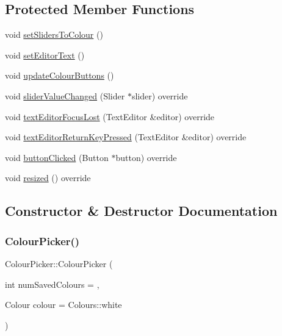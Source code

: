 \subsection*{Protected Member Functions}
\begin{DoxyCompactItemize}
\item 
void \mbox{\hyperlink{classColourPicker_ab5ff0a207d39bf95dbfa7f99b1ceb195}{set\+Sliders\+To\+Colour}} ()
\item 
void \mbox{\hyperlink{classColourPicker_a52bf8209281242f85ec63faa3393e624}{set\+Editor\+Text}} ()
\item 
void \mbox{\hyperlink{classColourPicker_a74764d4f6457f505f3ccb412c8628f44}{update\+Colour\+Buttons}} ()
\item 
void \mbox{\hyperlink{classColourPicker_a85d862565ab5e61870ab9b050ece7bf0}{slider\+Value\+Changed}} (Slider $\ast$slider) override
\item 
void \mbox{\hyperlink{classColourPicker_a4d8a73a1d31692df09192e27a9d32ac7}{text\+Editor\+Focus\+Lost}} (Text\+Editor \&editor) override
\item 
void \mbox{\hyperlink{classColourPicker_aa9e98e6dfda7410c7de9b1dbaf05ef19}{text\+Editor\+Return\+Key\+Pressed}} (Text\+Editor \&editor) override
\item 
void \mbox{\hyperlink{classColourPicker_a937924ab624cb81d4f2cb1e094ead86b}{button\+Clicked}} (Button $\ast$button) override
\item 
void \mbox{\hyperlink{classColourPicker_a9572f9b8ec233f5e89d1b6893c9b4300}{resized}} () override
\end{DoxyCompactItemize}


\subsection{Constructor \& Destructor Documentation}
\mbox{\label{classColourPicker_ab9845d6261629eab48409af6f6cadc78}} 
\subsubsection{\texorpdfstring{Colour\+Picker()}{ColourPicker()}}
{\footnotesize\ttfamily Colour\+Picker\+::\+Colour\+Picker (\begin{DoxyParamCaption}\item[{int}]{num\+Saved\+Colours = {},  }\item[{Colour}]{colour = {\ttfamily Colours\+:\+:white} }\end{DoxyParamCaption})}


